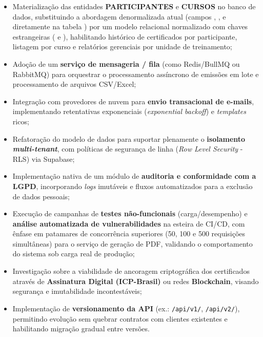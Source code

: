 \begin{itemize}
    \item Materialização das entidades \textbf{PARTICIPANTES} e \textbf{CURSOS} no banco de dados, substituindo a abordagem denormalizada atual (campos , ,  e  diretamente na tabela ) por um modelo relacional normalizado com chaves estrangeiras ( e ), habilitando histórico de certificados por participante, listagem por curso e relatórios gerenciais por unidade de treinamento;
    \item Adoção de um \textbf{serviço de mensageria / fila} (como Redis/BullMQ ou RabbitMQ) para orquestrar o processamento assíncrono de emissões em lote e processamento de arquivos CSV/Excel;
    \item Integração com provedores de nuvem para \textbf{envio transacional de e-mails}, implementando retentativas exponenciais (\textit{exponential backoff}) e \textit{templates} ricos;
    \item Refatoração do modelo de dados para suportar plenamente o \textbf{isolamento \textit{multi-tenant}}, com políticas de segurança de linha (\textit{Row Level Security} - RLS) via Supabase;
    \item Implementação nativa de um módulo de \textbf{auditoria e conformidade com a LGPD}, incorporando \textit{logs} imutáveis e fluxos automatizados para a exclusão de dados pessoais;
    \item Execução de campanhas de \textbf{testes não-funcionais} (carga/desempenho) e \textbf{análise automatizada de vulnerabilidades} na esteira de CI/CD, com ênfase em patamares de concorrência superiores (50, 100 e 500 requisições simultâneas) para o serviço de geração de PDF, validando o comportamento do sistema sob carga real de produção;
    \item Investigação sobre a viabilidade de ancoragem criptográfica dos certificados através de \textbf{Assinatura Digital (ICP-Brasil)} ou redes \textbf{Blockchain}, visando segurança e imutabilidade incontestáveis;
    \item Implementação de \textbf{versionamento da API} (ex.: \texttt{/api/v1/}, \texttt{/api/v2/}), permitindo evolução sem quebrar contratos com clientes existentes e habilitando migração gradual entre versões.
\end{itemize}
